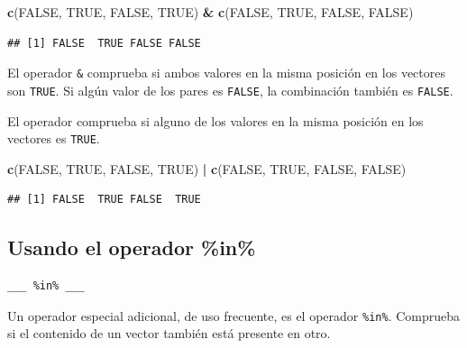 \documentclass[
]{book}
\newenvironment{Shaded}{\begin{snugshade}}{\end{snugshade}}
\newcommand{\KeywordTok}[1]{\textcolor[rgb]{0.13,0.29,0.53}{\textbf{#1}}}
\newcommand{\NormalTok}[1]{#1}
\newcommand{\OperatorTok}[1]{\textcolor[rgb]{0.81,0.36,0.00}{\textbf{#1}}}
\newcommand{\OtherTok}[1]{\textcolor[rgb]{0.56,0.35,0.01}{#1}}
\newcommand{\StringTok}[1]{\textcolor[rgb]{0.31,0.60,0.02}{#1}}
\begin{document}
\begin{Shaded}
\begin{Highlighting}[]
\KeywordTok{c}\NormalTok{(}\OtherTok{FALSE}\NormalTok{, }\OtherTok{TRUE}\NormalTok{, }\OtherTok{FALSE}\NormalTok{, }\OtherTok{TRUE}\NormalTok{) }\OperatorTok{&}\StringTok{ }\KeywordTok{c}\NormalTok{(}\OtherTok{FALSE}\NormalTok{, }\OtherTok{TRUE}\NormalTok{, }\OtherTok{FALSE}\NormalTok{, }\OtherTok{FALSE}\NormalTok{)}
\end{Highlighting}
\end{Shaded}

\begin{verbatim}
## [1] FALSE  TRUE FALSE FALSE
\end{verbatim}

El operador \texttt{\&} comprueba si ambos valores en la misma posición en los vectores son \texttt{TRUE}. Si algún valor de los pares es \texttt{FALSE}, la combinación también es \texttt{FALSE}.

El operador \texttt{\textbar{}} comprueba si alguno de los valores en la misma posición en los vectores es \texttt{TRUE}.

\begin{Shaded}
\begin{Highlighting}[]
\KeywordTok{c}\NormalTok{(}\OtherTok{FALSE}\NormalTok{, }\OtherTok{TRUE}\NormalTok{, }\OtherTok{FALSE}\NormalTok{, }\OtherTok{TRUE}\NormalTok{) }\OperatorTok{|}\StringTok{ }\KeywordTok{c}\NormalTok{(}\OtherTok{FALSE}\NormalTok{, }\OtherTok{TRUE}\NormalTok{, }\OtherTok{FALSE}\NormalTok{, }\OtherTok{FALSE}\NormalTok{)}
\end{Highlighting}
\end{Shaded}

\begin{verbatim}
## [1] FALSE  TRUE FALSE  TRUE
\end{verbatim}

\hypertarget{usando-el-operador-in}{%
\subsection{Usando el operador \%in\%}\label{usando-el-operador-in}}

\begin{verbatim}
___ %in% ___
\end{verbatim}

Un operador especial adicional, de uso frecuente, es el operador \texttt{\%in\%}. Comprueba si el contenido de un vector también está presente en otro.
\end{document}
